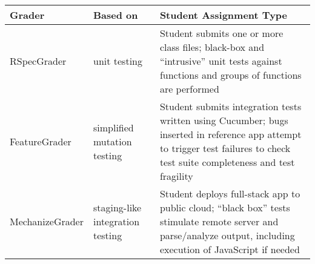\begin{tabular}{|p{}|p{}|p{}|}
 \hline
 \textbf{Grader} & \textbf{Based on} & \textbf{Student Assignment Type} \\
 \hline
 RSpecGrader &
 unit testing &
 Student submits one or more class files; black-box and ``intrusive''
 unit tests against functions and groups of functions are performed
 \\
 FeatureGrader &
 simplified mutation testing &
 Student submits integration tests written using Cucumber; bugs inserted
 in reference app attempt to trigger test failures to check test suite
 completeness and test fragility
 \\
 MechanizeGrader & 
 staging-like integration testing &
 Student deploys full-stack app to public cloud; ``black box'' tests
 stimulate remote server and parse/analyze output, including execution
 of JavaScript if needed
 \\
 \hline
\end{tabular}
